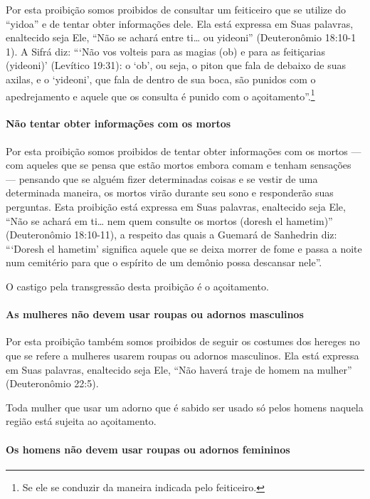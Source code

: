 Por esta proibição somos proibidos de consultar um feiticeiro que se
utilize do ``yidoa'' e de tentar obter informações dele. Ela está
expressa em Suas palavras, enaltecido seja Ele, ``Não se achará entre
ti\ldots{} ou yideoni'' (Deuteronômio 18:10-1 1). A Sifrá diz: ```Não vos
volteis para as magias (ob) e para as feitiçarias (yideoni)' (Levítico
19:31): o `ob', ou seja, o piton que fala de debaixo de suas axilas, e o
`yideoni', que fala de dentro de sua boca, são punidos com o
apedrejamento e aquele que os consulta é punido com o
açoitamento''.\footnote{Se ele se conduzir da maneira indicada pelo feiticeiro.}

\paragraph{Não tentar obter informações com os mortos}

Por esta proibição somos proibidos de tentar obter informações com os
mortos --- com aqueles que se pensa que estão mortos embora comam e
tenham sensações --- pensando que se alguém fizer determinadas coisas e
se vestir de uma determinada maneira, os mortos virão durante seu sono e
responderão suas perguntas. Esta proibição está expressa em Suas
palavras, enaltecido seja Ele, ``Não se achará em ti\ldots{} nem quem
consulte os mortos (doresh el hametim)'' (Deuteronômio 18:10-11), a
respeito das quais a Guemará de Sanhedrin diz: ```Doresh el hametim'
significa aquele que se deixa morrer de fome e passa a noite num
cemitério para que o espírito de um demônio possa descansar nele''.

O castigo pela transgressão desta proibição é o açoitamento.

\paragraph{As mulheres não devem usar roupas ou adornos masculinos}

Por esta proibição também somos proibidos de seguir os costumes dos
hereges no que se refere a mulheres usarem roupas ou adornos masculinos.
Ela está expressa em Suas palavras, enaltecido seja Ele, ``Não haverá
traje de homem na mulher'' (Deuteronômio 22:5).

Toda mulher que usar um adorno que é sabido ser usado só pelos homens
naquela região está sujeita ao açoitamento.

\paragraph{Os homens não devem usar roupas ou adornos femininos}

